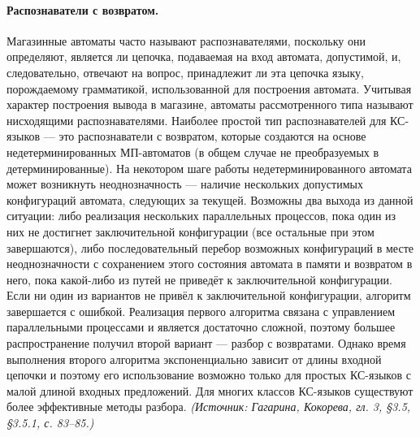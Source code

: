 \documentclass[a4paper,12pt]{article}
\begin{document}
\paragraph{Распознаватели с возвратом.}
Магазинные автоматы часто называют распознавателями, поскольку они определяют, является ли цепочка, подаваемая на вход автомата, допустимой, и, следовательно, отвечают на вопрос, принадлежит ли эта цепочка языку, порождаемому грамматикой, использованной для построения автомата. Учитывая характер построения вывода в магазине, автоматы рассмотренного типа называют нисходящими распознавателями. Наиболее простой тип распознавателей для КС-языков — это распознаватели с возвратом, которые создаются на основе недетерминированных МП-автоматов (в общем случае не преобразуемых в детерминированные). На некотором шаге работы недетерминированного автомата может возникнуть неоднозначность — наличие нескольких допустимых конфигураций автомата, следующих за текущей. Возможны два выхода из данной ситуации: либо реализация нескольких параллельных процессов, пока один из них не достигнет заключительной конфигурации (все остальные при этом завершаются), либо последовательный перебор возможных конфигураций в месте неоднозначности с сохранением этого состояния автомата в памяти и возвратом в него, пока какой-либо из путей не приведёт к заключительной конфигурации. Если ни один из вариантов не привёл к заключительной конфигурации, алгоритм завершается с ошибкой. Реализация первого алгоритма связана с управлением параллельными процессами и является достаточно сложной, поэтому большее распространение получил второй вариант — разбор с возвратами. Однако время выполнения второго алгоритма экспоненциально зависит от длины входной цепочки и поэтому его использование возможно только для простых КС-языков с малой длиной входных предложений. Для многих классов КС-языков существуют более эффективные методы разбора.
\textit{(Источник: Гагарина, Кокорева, гл. 3, §3.5, §3.5.1, с. 83--85.)}
\end{document}
